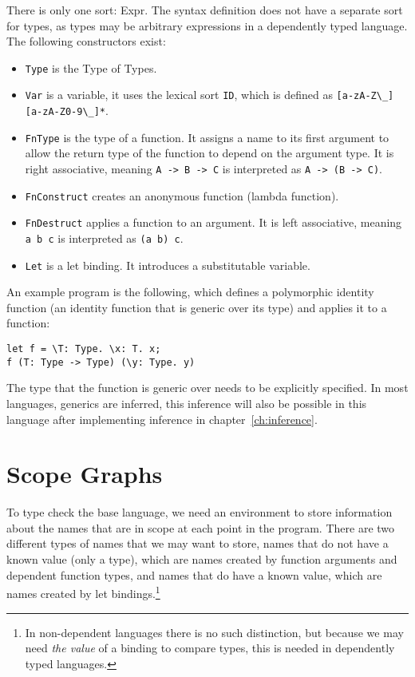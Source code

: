 There is only one sort: Expr. The syntax definition does not have a separate sort for types, as types may be arbitrary expressions in a dependently typed language. The following constructors exist:
\begin{itemize}
	\item \verb|Type| is the Type of Types.
	\item \verb|Var| is a variable, it uses the lexical sort \verb|ID|, which is defined as \verb|[a-zA-Z\_][a-zA-Z0-9\_]*|.
	\item \verb|FnType| is the type of a function. It assigns a name to its first argument to allow the return type of the function to depend on the argument type. It is right associative, meaning \verb|A -> B -> C| is interpreted as \verb|A -> (B -> C)|. 
	\item \verb|FnConstruct| creates an anonymous function (lambda function).
	\item \verb|FnDestruct| applies a function to an argument. It is left associative, meaning \verb|a b c| is interpreted as \verb|(a b) c|.
	\item \verb|Let| is a let binding. It introduces a substitutable variable.
\end{itemize}

An example program is the following, which defines a polymorphic identity function (an identity function that is generic over its type) and applies it to a function:

\begin{lstlisting}
let f = \T: Type. \x: T. x;
f (T: Type -> Type) (\y: Type. y)
\end{lstlisting}

The type that the function is generic over needs to be explicitly specified. In most languages, generics are inferred, this inference will also be possible in this language after implementing inference in chapter~\ref{ch:inference}.

\section{Scope Graphs}
\label{sec:coc-scopes}

To type check the base language, we need an environment to store information about the names that are in scope at each point in the program. There are two different types of names that we may want to store, names that do not have a known value (only a type), which are names created by function arguments and dependent function types, and names that do have a known value, which are names created by let bindings.\footnote{In non-dependent languages there is no such distinction, but because we may need \emph{the value} of a binding to compare types, this is needed in dependently typed languages.}

